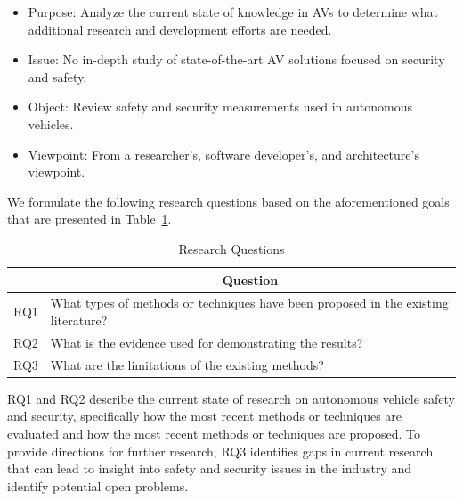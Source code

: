 \documentclass[a4paper,12pt]{article}
\begin{document}
\begin{itemize}
  \item Purpose: Analyze the current state of knowledge in AVs to determine what additional research and development efforts are needed. 
  \item Issue: No in-depth study of state-of-the-art AV solutions focused on security and safety.
  \item Object: Review safety and security measurements used in autonomous vehicles.
  \item Viewpoint: From a researcher's, software developer's, and architecture's viewpoint.
\end{itemize}

We formulate the following research questions based on the aforementioned goals that are presented in Table~\ref{tab:research_questions}.



\begin{table}[H]
\centering
\small
\setlength{\tabcolsep}{4pt}
\caption{Research Questions}
\label{tab:research_questions}
\begin{tabularx}{\linewidth}{|>{\centering\arraybackslash}p{2cm}|X|}
\rowcolor[HTML]{00D2CB} 
\hline
\multicolumn{1}{|c|}{\textbf{Id}} & 
\multicolumn{1}{c|}{\textbf{Question}} \\
\hline
RQ1 & What types of methods or techniques have been proposed in the existing literature? \\
\hline
RQ2 & What is the evidence used for demonstrating the results?  \\
\hline
RQ3 & What are the limitations of the existing methods? \\
\hline
\end{tabularx}
\end{table}

RQ1 and RQ2 describe the current state of research on autonomous vehicle safety and security, specifically how the most recent methods or techniques are evaluated and how the most recent methods or techniques are proposed. To provide directions for further research, RQ3 identifies gaps in current research that can lead to insight into safety and security issues in the industry and identify potential open problems.
\end{document}
